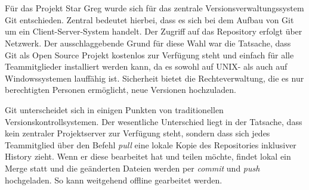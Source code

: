 \\
\\
Für das Projekt Star Greg wurde sich für das zentrale Versionsverwaltungssystem Git entschieden. Zentral bedeutet hierbei, dass es sich bei dem Aufbau von Git um ein Client-Server-System handelt. Der Zugriff auf das Repository erfolgt über Netzwerk. Der ausschlaggebende Grund für diese Wahl war die Tatsache, dass Git als Open Source Projekt kostenlos zur Verfügung steht und einfach für alle Teammitglieder installiert werden kann, da es sowohl auf UNIX- als auch auf Windowssystemen lauffähig ist. Sicherheit bietet die Rechteverwaltung, die es nur berechtigten Personen ermöglicht, neue Versionen hochzuladen. 

Git unterscheidet sich in einigen Punkten von traditionellen Versionskontrollsystemen. Der wesentliche Unterschied liegt in der Tatsache, dass kein zentraler Projektserver zur Verfügung steht, sondern dass sich jedes Teammitglied über den Befehl \textit{pull} eine lokale Kopie des Repositories inklusiver History zieht. Wenn er diese bearbeitet hat und teilen möchte, findet lokal ein Merge  statt und die geänderten Dateien werden per \textit{commit} und \textit{push} hochgeladen. So kann weitgehend offline gearbeitet werden. 

\autorende{}
